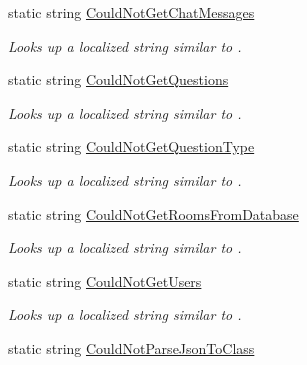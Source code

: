\begin{DoxyCompactItemize}
static string \hyperlink{class_wis_r_1_1_app___resources_1_1_resource_a60be876b3c0f2a4d2f485bae5fa6cc84}{Could\+Not\+Get\+Chat\+Messages}
\begin{DoxyCompactList}\small\item\em Looks up a localized string similar to . \end{DoxyCompactList}\item 
static string \hyperlink{class_wis_r_1_1_app___resources_1_1_resource_a66b876e57abc40c1f12530483bcf0839}{Could\+Not\+Get\+Questions}
\begin{DoxyCompactList}\small\item\em Looks up a localized string similar to . \end{DoxyCompactList}\item 
static string \hyperlink{class_wis_r_1_1_app___resources_1_1_resource_aaedf2d6c354c9c3e3ed6a72076c19ebc}{Could\+Not\+Get\+Question\+Type}
\begin{DoxyCompactList}\small\item\em Looks up a localized string similar to . \end{DoxyCompactList}\item 
static string \hyperlink{class_wis_r_1_1_app___resources_1_1_resource_a2f4ee18b64d2da83bf7e4e78f71c02b7}{Could\+Not\+Get\+Rooms\+From\+Database}
\begin{DoxyCompactList}\small\item\em Looks up a localized string similar to . \end{DoxyCompactList}\item 
static string \hyperlink{class_wis_r_1_1_app___resources_1_1_resource_a16d3e6cb33290716861a18e5b5e16a43}{Could\+Not\+Get\+Users}
\begin{DoxyCompactList}\small\item\em Looks up a localized string similar to . \end{DoxyCompactList}\item 
static string \hyperlink{class_wis_r_1_1_app___resources_1_1_resource_a9969e884d28e1923437de6f99006dd16}{Could\+Not\+Parse\+Json\+To\+Class}

\end{DoxyCompactItemize}
